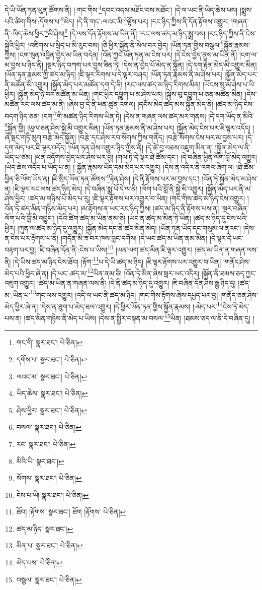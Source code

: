 དེ་ཡི་ཡོན་ཏན་ཕུན་ཚོགས་ནི། །:གང་གིས་\footnote{གང་གི་  སྣར་ཐང་།  པེ་ཅིན། }དབང་འདས་མཐོང་བས་མཐོང་། །དེ་ལ་ཡང་ནི་ཡིད་ཆེས་པས། །སྨྲས་པའི་ཚིག་གིས་:དོགས་པ་\footnote{དགོས་པ་  སྣར་ཐང་།  པེ་ཅིན། }མེད། །དེ་ནི་གང་:ལའང་མི་\footnote{ལའང་མ་  སྣར་ཐང་།  པེ་ཅིན། }ལྟོས་པར། །རང་ཉིད་ཀྱིས་ནི་དོན་རྟོགས་འགྱུར། །གཞན་ནི་:ཡིད་ཆེས་ཕྱིར་\footnote{ཡིད་ཆེས་  སྣར་ཐང་།  པེ་ཅིན། }མི་ཤེས།\footnote{ཤེས་ཕྱིར།  སྣར་ཐང་།  པེ་ཅིན། } །དེ་ལས་དོན་རྟོགས་མ་ཡིན་ནོ། །རང་ལས་ཚད་མ་ཉིད་སྨྲ་བས། །རང་ཉིད་ཀྱིས་ནི་ངེས་སྐྱེའི་ཕྱིར། །འཇིགས་པ་སྲིད་པ་མི་རུང་བས། །ཅི་ཕྱིར་སྐྱོན་ནི་སེལ་བར་བྱེད། །ཡོན་ཏན་གྱིས་བསྩལ་\footnote{བསལ་  སྣར་ཐང་།  པེ་ཅིན། }སྐྱོན་རྣམས་ཀྱིས། །ངག་སུན་འབྱིན་བྱེད་མ་ཡིན་བདེན། །འོན་ཀྱང་ཡོན་ཏན་མ་ངེས་པར། །དེ་ངེས་བྱེད་ནུས་མ་ཡིན་ནོ། །ངག་ལ་མ་བྱས་པ་ཉིད་ནི། །སྔར་ཉིད་བཀག་པར་བྱས་ཟིན་ཏེ། །དེས་ན་བྱེད་པོ་མེད་ན་སྐྱོན། །དེ་དག་རྟེན་མེད་མི་འགྱུར་མིན། །ཡོན་ཏན་རྣམས་ཀྱི་ཚད་མ་ཉིད། །ཇི་ལྟར་རིགས་པ་དེ་ལྟར་བཤད། །ཡོན་ཏན་རྣམས་ནི་མ་ཤེས་པར། །སྐྱོན་མེད་པར་ནི་མཚོན་མི་འགྱུར། །སྐྱོན་མེད་པར་མཚོན་དག་དེ་ནི། །རང་ལས་ཚད་མ་ཉིད་རིགས་མིན། །ཡོངས་སུ་མ་ཤེས་པ་ཡི་ཕྱིར། །སྐྱོན་མེད་ཉེ་བར་མཚོན་མ་ཡིན། །གང་ཕྱིར་དབྱུག་པ་མ་ཤེས་པར། །སྐྱེས་བུ་དབྱུག་པ་ཅན་མཚོན་མིན། །དེས་མཚོན་རང་ལས་ཚད་མ་ནི། །ཞེས་བྱ་དེ་ནི་ཕན་ཚུན་འགལ། །དངོས་མེད་ཚད་མས་སྐྱོན་མེད་ནི། །ཚད་མ་ཉིད་ངེས་བདག་ཉིད་ཅན། །ངག་\footnote{རང་  སྣར་ཐང་།  པེ་ཅིན། }གི་མཚན་ཉིད་རིགས་ཡིན་ཏེ། །དེས་ན་གཞན་ལས་ཚད་མར་གནས། །དེ་དག་ཡོད་ན་མིའི་\footnote{མིའི་ཡི་  སྣར་ཐང་། }སྐྱོན་གྱི། །ཡུལ་ཅན་ཤེས་སྐྱེ་མི་འགྱུར་མིན། །ཡོན་ཏན་རྣམས་ནི་མ་ཤེས་པར། །སྐྱོན་མེད་ངེས་པར་ཇི་ལྟར་འདོད། །ཞེ་སྡང་གཏི་མུག་བརྩེ་མེད་སྐྱོན། །བརྩེ་དང་ཤེས་རབ་སོགས་ཀྱིས་གནོད། །བརྩེ་སོགས་ངེས་པར་མ་བྱས་པར། །དེ་དག་མེད་པར་ཇི་ལྟར་འདོད། །ཡོན་ཏན་ཤེས་འགྱུར་ཉིད་ཀྱིས་ནི། །དེ་ཚེ་བྱ་བཅས་འཇུག་མིན་ན། །སྐྱོན་མེད་ལ་ནི་ཡོད་པ་ཙམ། །ཕན་འདོགས་བྱེད་པར་ཤེས་པར་བྱ། །གལ་ཏེ་དེ་ལྟར་ཐེ་ཚོམ་དང་། །དེ་བཞིན་ཕྱིན་ལོག་བློ་མེད་འགྱུར། །ཡིད་ཆེས་འདོད་པ་ཡོད་པ་ན། །
སྐྱོན་རྣམས་ཡོད་དམ་མེད་པར་འགྱུར། །དེས་ན་འདིར་ནི་འགའ་ཞིག་ལ། །ཐེ་ཚོམ་ཕྱིན་ཅི་ལོག་ཡོད་ན། །ཇི་སྲིད་ཡོན་ཏན་ཚོགས་\footnote{སོགས་  སྣར་ཐང་།  པེ་ཅིན། }རྟེན་ཤེས། །དེ་ནི་རྟོགས་པར་མ་བྱས་དང་། །འོན་ཏེ་སྐྱོན་མེད་མ་ཤེས་ན། །ཇི་ལྟར་རང་ལས་ཚད་ཉིད་མེད། །དེ་བཞིན་སྨྲ་པོ་དེ་ལ་ནི། །ལོག་པའི་བློ་ནི་སྐྱེ་མི་འགྱུར། །སྐྱོན་མེད་པར་ནི་མ་ཤེས་ཕྱིར། །ཚད་མ་གཉིས་པོ་མེད་པ་རུ། །ཇི་ལྟར་རྟོགས་པར་འགྱུར་བ་ཡིན། །གང་གིས་ཚད་མ་ཉིད་ངེས་འགྱུར། །འོན་ཏེ་ཚད་མིན་གཉིས་མེད་པར། །མ་རྟོགས་ན་ཡང་རང་ཉིད་ཀྱིས། །ཚད་མ་ཉིད་ནི་རྟོགས་པས་ན། །སྔར་བཞིན་ལོག་པའི་བློ་མི་འབྱུང་། །དེའི་ཚིག་ཚད་མ་ཡིན་ནམ་ཅི། །ཡང་ན་ཚད་མ་མིན་ཏེ་ཡིན། །ཚད་མ་ཉིད་དུ་ངེས་པའི་ཕྱིར། །ཀུན་ལ་ཚད་མ་ཉིད་དུ་འགྱུར། །སྐྱོན་མེད་དང་ནི་ཚད་མིན་མེད། །ཡོན་ཏན་ཡོད་དང་གསུམ་ལ་ནའང་། །དེས་ན་ངེས་པར་རྟོགས་པ་ནི། །གདོན་མི་ཟ་བར་ཁས་བླང་དགོས། །དེ་ཡང་ཚད་མ་ཡིན་ནམ་མིན། །དེ་ལྟར་དེ་ཡང་བརྟག་པར་བྱ། །ཇི་བཞིན་དོན་ནི་:ངེས་པ་ཡིས།\footnote{ངེས་པ་ཡི།  སྣར་ཐང་།  པེ་ཅིན། } །ཡན་ལག་ཚད་མིན་ཇི་ལྟར་འགྱུར། །ཚད་མ་ཡིན་ན་གཞན་ལས་ནི། །དེ་ཡིས་ཚད་མ་ཉིད་ངེས་ཐོབ། །རྟོག་\footnote{ཐོབ། །རྟོགས་  སྣར་ཐང་། ཐོག །རྟོགས་  པེ་ཅིན། }པ་དེ་ཡི་ཚད་མ་ཉིད། །ཇི་ལྟར་རྟོགས་པར་འགྱུར་བ་ཡིན། །གནོད་ཤེས་མེད་པའི་ཕྱིར་ཞེ་ན། །དེ་ཡང་:ཚད་མ་\footnote{ཚད་མ་ཉིད་  སྣར་ཐང་། }ཡིན་ནམ་ཅི། །འོན་ཏེ་མིན་ཞེས་སླར་ཡང་འདིར། །སྐྱོན་ནི་ཐམས་ཅད་ཀྱང་འཇུག་འགྱུར། །ཚད་མ་ཡིན་ན་གཞན་ལས་ནི། །དེ་ནི་ཚད་མ་ཉིད་དུ་འགྱུར། །ཇི་བཞིན་དོན་ཤེས་རྒྱུ་ཉིད་དུ། །ཚད་མ་:ཡིན་པ་\footnote{མིན་པ་  སྣར་ཐང་།  པེ་ཅིན། }གང་ལས་འགྱུར། །འདི་ལ་ཡང་ནི་ཚད་མ་ཉིད། །གང་གིས་རྟོགས་ཞེས་དཔྱད་པར་བྱ། །གནོད་ཅན་ཤེས་མེད་ཕྱིར་ཞེ་ན། །དེས་ན་ཐུག་པ་མེད་ཐལ་འགྱུར། །དེ་ཕྱིར་ཡོན་ཏན་གྱིས་སྐྱོན་རྣམས། །:མེད་པར་\footnote{མེད་པས་  པེ་ཅིན། }ངེས་ཏེ་མེད་པས་ན། །ཚད་མིན་གཉིས་ནི་མེད་པ་ཡིས། །དེས་ན་སྤྱིར་བསྟན་མ་བསལ་\footnote{བསྩལ་  སྣར་ཐང་།  པེ་ཅིན། }ཡིན། །ཐམས་ཅད་ལ་ནི་དེ་བཞིན་དུ། །
